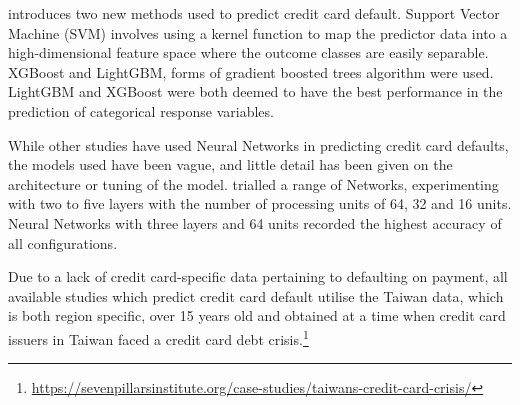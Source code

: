 \documentclass[
]{article}
\begin{document}
\citet{Yang2018-rt} introduces two new methods used to predict credit
card default. Support Vector Machine (SVM) involves using a kernel
function to map the predictor data into a high-dimensional feature space
where the outcome classes are easily separable. XGBoost and LightGBM,
forms of gradient boosted trees algorithm were used. LightGBM and
XGBoost were both deemed to have the best performance in the prediction
of categorical response variables.

While other studies have used Neural Networks in predicting credit card
defaults, the models used have been vague, and little detail has been
given on the architecture or tuning of the model. \citet{dnn2} trialled
a range of Networks, experimenting with two to five layers with the
number of processing units of 64, 32 and 16 units. Neural Networks with
three layers and 64 units recorded the highest accuracy of all
configurations.

Due to a lack of credit card-specific data pertaining to defaulting on
payment, all available studies which predict credit card default utilise
the Taiwan data, which is both region specific, over 15 years old and
obtained at a time when credit card issuers in Taiwan faced a credit
card debt crisis.\footnote{\url{https://sevenpillarsinstitute.org/case-studies/taiwans-credit-card-crisis/}}
\end{document}
